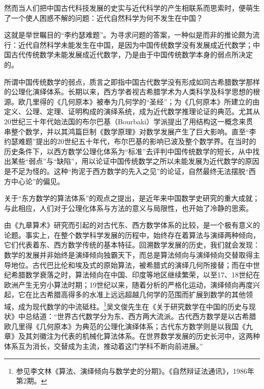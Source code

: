 \documentclass[12pt,UTF8]{ctexbook}
\begin{document}
然而当人们把中国古代科技发展的史实与近代科学的产生相联系而思索时，便萌生了一个使人困惑不解的问题：近代自然科学为何不发生在中国？

这就是举世瞩目的“李约瑟难题”。为寻求问题的答案，一种似是而非的推论颇为流行：近代自然科学未能发生在中国，是因为中国传统数学没有发展成近代数学；中国古代传统数学未能发展成近代数学，乃是由于中国传统数学本身的弱点所决定的。

所谓中国传统数学的弱点，质言之即指中国古代数学没有形成如同古希腊数学那样的公理化演绎体系。长期以来，西方学者视古希腊学术为人类科学及科学思想的根源。欧几里得的《几何原本》被奉为几何学的“圣经”；为《几何原本》所建立的由定义、公理、定理、证明构成的演绎系统，成为近代数学推理论证的典范。尤其从20世纪三十年代始法国的布尔巴基（Bourbaki）学派提出了用结构这一概念来贯串整个数学，并以其鸿篇巨制《数学原理》对数学发展产生了巨大影响。直至“李约瑟难题”提出的20世纪五十年代，布尔巴基的影响已波及整个数学界。在当时的历史条件下，以西方数学公理化体系为“标准”去评判中国传统数学的短长，从中找出某些“弱点”与“缺陷”，用以论证中国传统数学之所以未能发展为近代数学的原因是不足为怪的。这种“拘泥于西方数学的先入之见”的论证，自然最终无法摆脱“西方中心论”的偏见。

关于“东方数学的算法体系”的观点之提出，是近年来中国数学史研究的重大成就；与此相应，人们对于公理化体系与方法的意义与局限性，也开始了冷静的思索。

由《九章算术》研究而引起的对古代东、西方数学体系的比较，是一个极有意义的论题。事实上，在整个数学科学发展的历程中，始终存在着算法与演绎两种倾向，它们代表着东、西方数学传统的基本特征。回溯数学发展的历史，我们就会发现：数学的发展并非始终是演绎倾向独霸天下，而总是算法倾向与演绎倾向交替取得主导地位。古代巴比伦和埃及式的原始算法，被希腊式的演绎几何所接替；而在中世纪希腊数学衰落之时，算法倾向在中国、印度等地区继续繁荣，以至17、18世纪在欧洲产生无穷小算法时期；19世纪以来，随着分析的严格化运动，演绎倾向再度兴起，它在比古希腊高得多的水准上远远超越几何学的范围而扩展到数学的其他领域，成为现代数学的中流砥柱。\footnote{参见李文林《算法、演绎倾向与数学史的分期》。《自然辩证法通讯》，1986年第2期。}吴文俊先生在《关于研究数学在中国的历史与现状》中总结道：“世界古代数学分为东、西方两大流派。古代西方数学是以古希腊欧几里得《几何原本》为典范的公理化演绎体系；古代东方数学则是以我国《九章》及其刘徽注为代表的机械化算法体系。在世界数学发展的历史长河中，这两种体系互为消长，交替成为主流，推动着这门学科不断向前进展。”
\end{document}
